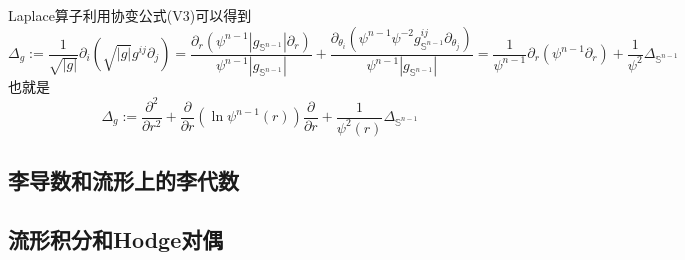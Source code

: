Laplace算子利用协变公式(V3)可以得到
\begin{equation*}
    \Delta_g := \frac{1}{\sqrt{|g|}} \partial_i (\sqrt{|g|}g^{ij}\partial_j )
    =     \frac{\partial_r (\psi^{n-1} |g_{\mathbb{S}^{n-1}}| \partial_r)}{\psi^{n-1} |g_{\mathbb{S}^{n-1}}|}  
    + \frac{\partial_{\theta_i} ( \psi^{n-1} \psi^{-2} g_{\mathbb{S}^{n-1}}^{ij} \partial_{\theta_j})}{\psi^{n-1} |g_{\mathbb{S}^{n-1}}|}
    = \frac{1}{\psi^{n-1}}\partial_r (\psi^{n-1}\partial_r) + \frac{1}{\psi^2}\Delta_{\mathbb{S}^{n-1}}
\end{equation*}
也就是
\begin{equation*}
    \Delta_g := \frac{\partial^2}{\partial r^2} + \frac{\partial }{\partial r}(\ln \psi^{n-1}(r)) \frac{\partial }{\partial r} + \frac{1}{\psi^2(r)}\Delta_{\mathbb{S}^{n-1}}
\end{equation*}


\subsection{李导数和流形上的李代数}


\subsection{流形积分和Hodge对偶}
